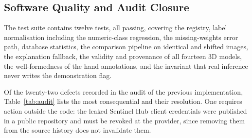 \documentclass[a4paper,12pt,oneside]{book}
\begin{document}
\subsection{Software Quality and Audit Closure}
The test suite contains twelve tests, all passing, covering the registry, label normalisation including the numeric-class regression, the missing-weights error path, database statistics, the comparison pipeline on identical and shifted images, the explanation fallback, the validity and provenance of all fourteen 3D models, the well-formedness of the hand annotations, and the invariant that real inference never writes the demonstration flag.

Of the twenty-two defects recorded in the audit of the previous implementation, Table~\ref{tab:audit} lists the most consequential and their resolution. One requires action outside the code: the leaked Sentinel Hub client credentials were published in a public repository and must be revoked at the provider, since removing them from the source history does not invalidate them.
\end{document}
